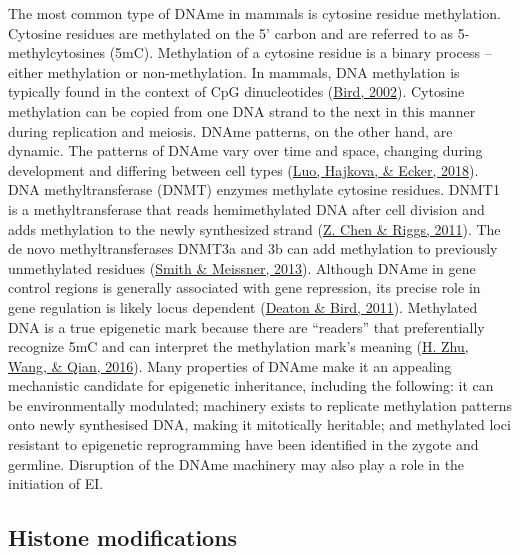 \documentclass[12pt,twoside]{reedthesis}
\begin{document}
The most common type of DNAme in mammals is cytosine residue
methylation. Cytosine residues are methylated on the 5' carbon and are
referred to as 5-methylcytosines (5mC). Methylation of a cytosine
residue is a binary process -- either methylation or non-methylation. In
mammals, DNA methylation is typically found in the context of CpG
dinucleotides (\protect\hyperlink{ref-bird2002}{Bird, 2002}). Cytosine methylation can be copied from one
DNA strand to the next in this manner during replication and meiosis.
DNAme patterns, on the other hand, are dynamic. The patterns of DNAme
vary over time and space, changing during development and differing
between cell types (\protect\hyperlink{ref-luo2018}{Luo, Hajkova, \& Ecker, 2018}). DNA methyltransferase (DNMT) enzymes
methylate cytosine residues. DNMT1 is a methyltransferase that reads
hemimethylated DNA after cell division and adds methylation to the newly
synthesized strand (\protect\hyperlink{ref-chen2011}{Z. Chen \& Riggs, 2011}). The de novo methyltransferases DNMT3a
and 3b can add methylation to previously unmethylated residues
(\protect\hyperlink{ref-smith2013}{Smith \& Meissner, 2013}). Although DNAme in gene control regions is generally
associated with gene repression, its precise role in gene regulation is
likely locus dependent (\protect\hyperlink{ref-deaton2011}{Deaton \& Bird, 2011}). Methylated DNA is a true
epigenetic mark because there are ``readers'' that preferentially
recognize 5mC and can interpret the methylation mark's meaning
(\protect\hyperlink{ref-zhu2016a}{H. Zhu, Wang, \& Qian, 2016}). Many properties of DNAme make it an appealing mechanistic
candidate for epigenetic inheritance, including the following: it can be
environmentally modulated; machinery exists to replicate methylation
patterns onto newly synthesised DNA, making it mitotically heritable;
and methylated loci resistant to epigenetic reprogramming have been
identified in the zygote and germline. Disruption of the DNAme machinery
may also play a role in the initiation of EI.

\hypertarget{histone-modifications}{%
\subsection*{Histone modifications}\label{histone-modifications}}
\end{document}
